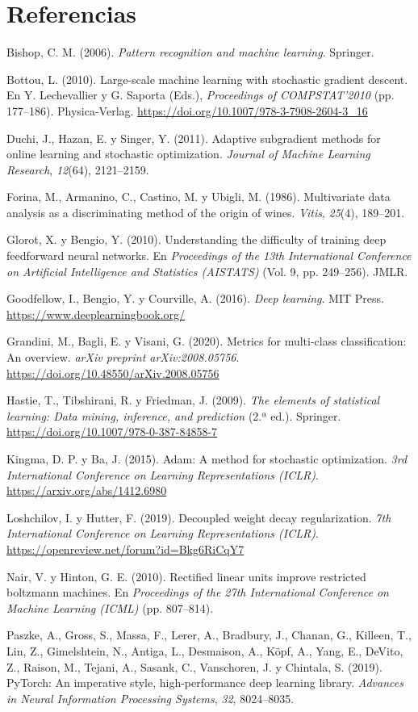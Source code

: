 \documentclass[12pt,letterpaper]{article}
\newcommand{\refapa}[1]{\par\noindent\hangindent=0.5in\hangafter=1 #1\par}
\begin{document}
\clearpage\section{Referencias}
\refapa{Bishop, C. M. (2006). \textit{Pattern recognition and machine learning}. Springer.}
\refapa{Bottou, L. (2010). Large-scale machine learning with stochastic gradient descent. En Y. Lechevallier y G. Saporta (Eds.), \textit{Proceedings of COMPSTAT'2010} (pp. 177--186). Physica-Verlag. \url{https://doi.org/10.1007/978-3-7908-2604-3_16}}
\refapa{Duchi, J., Hazan, E. y Singer, Y. (2011). Adaptive subgradient methods for online learning and stochastic optimization. \textit{Journal of Machine Learning Research}, \textit{12}(64), 2121--2159.}
\refapa{Forina, M., Armanino, C., Castino, M. y Ubigli, M. (1986). Multivariate data analysis as a discriminating method of the origin of wines. \textit{Vitis}, \textit{25}(4), 189--201.}
\refapa{Glorot, X. y Bengio, Y. (2010). Understanding the difficulty of training deep feedforward neural networks. En \textit{Proceedings of the 13th International Conference on Artificial Intelligence and Statistics (AISTATS)} (Vol. 9, pp. 249--256). JMLR.}
\refapa{Goodfellow, I., Bengio, Y. y Courville, A. (2016). \textit{Deep learning}. MIT Press. \url{https://www.deeplearningbook.org/}}
\refapa{Grandini, M., Bagli, E. y Visani, G. (2020). Metrics for multi-class classification: An overview. \textit{arXiv preprint arXiv:2008.05756}. \url{https://doi.org/10.48550/arXiv.2008.05756}}
\refapa{Hastie, T., Tibshirani, R. y Friedman, J. (2009). \textit{The elements of statistical learning: Data mining, inference, and prediction} (2.ª ed.). Springer. \url{https://doi.org/10.1007/978-0-387-84858-7}}
\refapa{Kingma, D. P. y Ba, J. (2015). Adam: A method for stochastic optimization. \textit{3rd International Conference on Learning Representations (ICLR)}. \url{https://arxiv.org/abs/1412.6980}}
\refapa{Loshchilov, I. y Hutter, F. (2019). Decoupled weight decay regularization. \textit{7th International Conference on Learning Representations (ICLR)}. \url{https://openreview.net/forum?id=Bkg6RiCqY7}}
\refapa{Nair, V. y Hinton, G. E. (2010). Rectified linear units improve restricted boltzmann machines. En \textit{Proceedings of the 27th International Conference on Machine Learning (ICML)} (pp. 807--814).}
\refapa{Paszke, A., Gross, S., Massa, F., Lerer, A., Bradbury, J., Chanan, G., Killeen, T., Lin, Z., Gimelshtein, N., Antiga, L., Desmaison, A., Köpf, A., Yang, E., DeVito, Z., Raison, M., Tejani, A., Sasank, C., Vanschoren, J. y Chintala, S. (2019). PyTorch: An imperative style, high-performance deep learning library. \textit{Advances in Neural Information Processing Systems}, \textit{32}, 8024--8035.}
\end{document}
